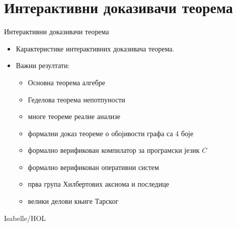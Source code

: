 \documentclass[slidestop, compress, mathserif, containsverbatim, xcolor=dvipsnames]{beamer}
\begin{document}
\section{Интерактивни доказивачи теорема}

\begin{frame}{Интерактивни доказивачи теорема}
  \begin{itemize}
  \item Карактеристике интерактивних доказивача теорема. \vfill
  \item Важни резултати:
    \begin{itemize}
    \item Основна теорема алгебре
    \item Геделова теорема непотпуности
    \item многе теореме реалне анализе
    \item формални доказ теореме о обојивости графа са 4 боје
    \item формално верификован компилатор за програмски језик $C$
    \item формално верификован оперативни систем
    \item прва група Хилбертових аксиома и последице
    \item велики делови књиге Тарског
    \end{itemize}\vfill
  \end{itemize}
\end{frame}

{
\begin{frame}[plain]{Isabelle/HOL}
\end{frame}
}
\end{document}
